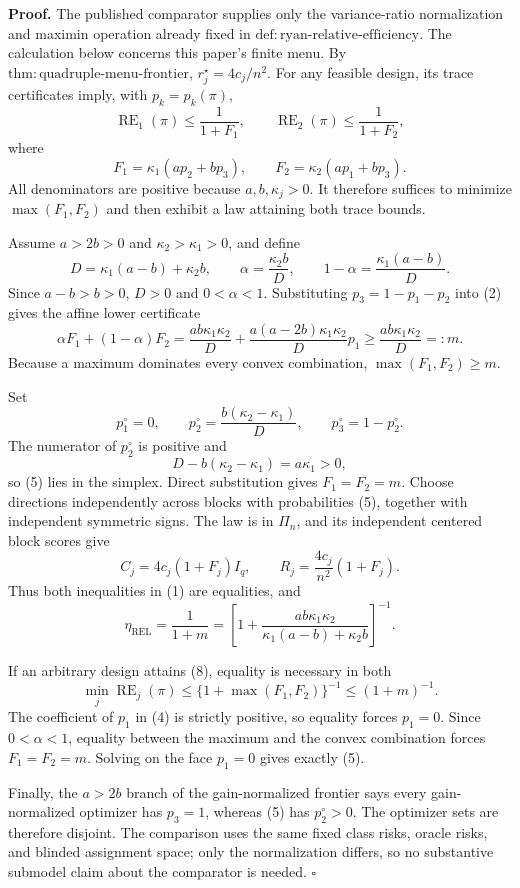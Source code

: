 \textbf{Proof.}
The published comparator supplies only the variance-ratio normalization and maximin operation already fixed in \(\mathrm{def:ryan\text{-}relative\text{-}efficiency}\).  The calculation below concerns this paper's finite menu.  By \(\mathrm{thm:quadruple\text{-}menu\text{-}frontier}\), \(r_j^\star=4c_j/n^2\).  For any feasible design, its trace certificates imply, with \(p_k=p_k(\pi)\),
\[
\operatorname{RE}_1(\pi)\le\frac1{1+F_1},
\qquad
\operatorname{RE}_2(\pi)\le\frac1{1+F_2},
\tag{1}
\]
where
\[
F_1=\kappa_1(ap_2+bp_3),
\qquad
F_2=\kappa_2(ap_1+bp_3).
\tag{2}
\]
All denominators are positive because \(a,b,\kappa_j>0\).  It therefore suffices to minimize \(\max(F_1,F_2)\) and then exhibit a law attaining both trace bounds.

Assume \(a>2b>0\) and \(\kappa_2>\kappa_1>0\), and define
\[
D=\kappa_1(a-b)+\kappa_2b,
\qquad
\alpha=\frac{\kappa_2b}{D},
\qquad
1-\alpha=\frac{\kappa_1(a-b)}D.
\tag{3}
\]
Since \(a-b>b>0\), \(D>0\) and \(0<\alpha<1\).  Substituting \(p_3=1-p_1-p_2\) into (2) gives the affine lower certificate
\[
\alpha F_1+(1-\alpha)F_2
=\frac{ab\kappa_1\kappa_2}{D}
+\frac{a(a-2b)\kappa_1\kappa_2}{D}p_1
\ge \frac{ab\kappa_1\kappa_2}{D}=:m.
\tag{4}
\]
Because a maximum dominates every convex combination, \(\max(F_1,F_2)\ge m\).

Set
\[
p_1^\circ=0,
\qquad
p_2^\circ=\frac{b(\kappa_2-\kappa_1)}D,
\qquad
p_3^\circ=1-p_2^\circ.
\tag{5}
\]
The numerator of \(p_2^\circ\) is positive and
\[
D-b(\kappa_2-\kappa_1)=a\kappa_1>0,
\tag{6}
\]
so (5) lies in the simplex.  Direct substitution gives \(F_1=F_2=m\).  Choose directions independently across blocks with probabilities (5), together with independent symmetric signs.  The law is in \(\Pi_n\), and its independent centered block scores give
\[
C_j=4c_j(1+F_j)I_q,
\qquad
R_j=\frac{4c_j}{n^2}(1+F_j).
\tag{7}
\]
Thus both inequalities in (1) are equalities, and
\[
\eta_{\mathrm{REL}}
=\frac1{1+m}
=\left[1+\frac{ab\kappa_1\kappa_2}
{\kappa_1(a-b)+\kappa_2b}\right]^{-1}.
\tag{8}
\]

If an arbitrary design attains (8), equality is necessary in both
\[
\min_j\operatorname{RE}_j(\pi)
\le\{1+\max(F_1,F_2)\}^{-1}
\le(1+m)^{-1}.
\tag{9}
\]
The coefficient of \(p_1\) in (4) is strictly positive, so equality forces \(p_1=0\).  Since \(0<\alpha<1\), equality between the maximum and the convex combination forces \(F_1=F_2=m\).  Solving on the face \(p_1=0\) gives exactly (5).

Finally, the \(a>2b\) branch of the gain-normalized frontier says every gain-normalized optimizer has \(p_3=1\), whereas (5) has \(p_2^\circ>0\).  The optimizer sets are therefore disjoint.  The comparison uses the same fixed class risks, oracle risks, and blinded assignment space; only the normalization differs, so no substantive submodel claim about the comparator is needed.  \(\square\)